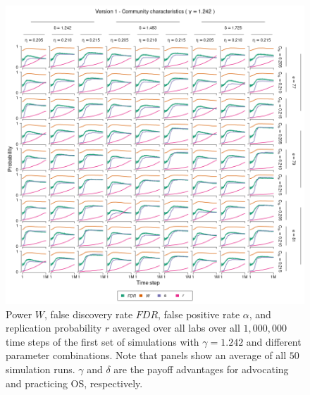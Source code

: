 \documentclass[meta, authordate,issue]{jote-new-article}
\begin{document}
\begin{figure}
  \begin{fullwidth}
    \centering
    \includegraphics[width=\textwidth]{v1_cha_plot_sens_payypro1.242.png}
    \caption{Power $W$, false discovery rate $FDR$, false positive rate $\alpha$, and replication probability $r$ averaged over all labs over all $1,000,000$ time steps of the first set of simulations with $\gamma=1.242$ and different parameter combinations. Note that panels show an average of all $50$ simulation runs. $\gamma$ and $\delta$ are the payoff advantages for advocating and practicing OS, respectively.}
    \label{fig:v1_cha_plot_sens_payypro1.242}
  \end{fullwidth}
\end{figure}
%
%
\end{document}

